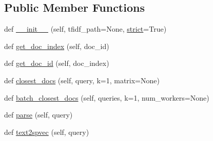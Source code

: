 \subsection*{Public Member Functions}
\begin{DoxyCompactItemize}
\item 
def \hyperlink{classparlai_1_1agents_1_1tfidf__retriever_1_1tfidf__doc__ranker_1_1TfidfDocRanker_a8bd42fd68fe2d18965bc4ad3b8940ba8}{\+\_\+\+\_\+init\+\_\+\+\_\+} (self, tfidf\+\_\+path=None, \hyperlink{classparlai_1_1agents_1_1tfidf__retriever_1_1tfidf__doc__ranker_1_1TfidfDocRanker_a8c3f9e75f2a3b3ae127e87f25600c7fb}{strict}=True)
\item 
def \hyperlink{classparlai_1_1agents_1_1tfidf__retriever_1_1tfidf__doc__ranker_1_1TfidfDocRanker_a4992c638010961247510dcb2ab96bd8e}{get\+\_\+doc\+\_\+index} (self, doc\+\_\+id)
\item 
def \hyperlink{classparlai_1_1agents_1_1tfidf__retriever_1_1tfidf__doc__ranker_1_1TfidfDocRanker_a4ef2a607fd94e1ad9cf44239c8910378}{get\+\_\+doc\+\_\+id} (self, doc\+\_\+index)
\item 
def \hyperlink{classparlai_1_1agents_1_1tfidf__retriever_1_1tfidf__doc__ranker_1_1TfidfDocRanker_a0573e296758121d2c40563e93acdf366}{closest\+\_\+docs} (self, query, k=1, matrix=None)
\item 
def \hyperlink{classparlai_1_1agents_1_1tfidf__retriever_1_1tfidf__doc__ranker_1_1TfidfDocRanker_a3ed4fd5025cc8b1996efc9354ccc8e54}{batch\+\_\+closest\+\_\+docs} (self, queries, k=1, num\+\_\+workers=None)
\item 
def \hyperlink{classparlai_1_1agents_1_1tfidf__retriever_1_1tfidf__doc__ranker_1_1TfidfDocRanker_a44274f0f828a51c50c641317663e56eb}{parse} (self, query)
\item 
def \hyperlink{classparlai_1_1agents_1_1tfidf__retriever_1_1tfidf__doc__ranker_1_1TfidfDocRanker_ac6d8b86317616a64f5bc7f8f607dd997}{text2spvec} (self, query)
\end{DoxyCompactItemize}
